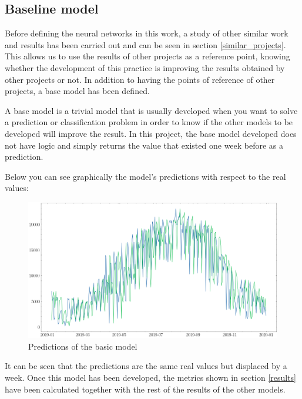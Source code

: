 \subsection{Baseline model}\label{baseline_model}

Before defining the neural networks in this work, a study of other similar work and results has been carried out and can be seen in section \ref{similar_projects}. This allows us to use the results of other projects as a reference point, knowing whether the development of this practice is improving the results obtained by other projects or not. In addition to having the points of reference of other projects, a base model has been defined.
\newline

A base model is a trivial model that is usually developed when you want to solve a prediction or classification problem in order to know if the other models to be developed will improve the result. In this project, the base model developed does not have logic and simply returns the value that existed one week before as a prediction.  
\newline

Below you can see graphically the model's predictions with respect to the real values:
\begin{figure}[H]
    \centering
    \includegraphics[width=16cm]{images/solution/predictions/baseline-predictions.png}
    \caption{Predictions of the basic model}
    \label{fig:baseline-predictions}
\end{figure}

It can be seen that the predictions are the same real values but displaced by a week. Once this model has been developed, the metrics shown in section \ref{results} have been calculated together with the rest of the results of the other models.
